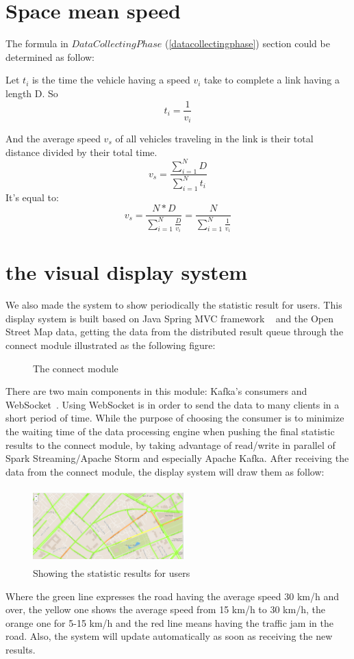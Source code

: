 \documentclass{acm_proc_article-sp}
\begin{document}
\section{Space mean speed}
The formula in $Data Collecting Phase$ (\ref{datacollectingphase}) section could be determined as follow:

Let $t_{i}$ is the time the vehicle having a speed $v_{i}$ take to complete a link having a length D. So
	\[ t_{i} = \frac{1}{v_{i}} \] 

And the average speed $v_{s}$ of all vehicles traveling in the link is their total distance divided by their total time.
	\[v_{s} = \frac{\sum_{i=1}^{N} D}{\sum_{i=1}^{N} t_{i}}\]
It's equal to:
	\[v_{s} = \frac{N \ast D}{\sum_{i=1}^{N} \frac{D}{v_{i}}} = \frac{N}{\sum_{i=1}^{N}\frac{1}{v_{i}}} \]

\section{the visual display system}

We also made the system to show periodically the statistic result for users. This display system is built based on Java Spring MVC framework ~\cite{javaspringmvc} and the Open Street Map data, getting the data from the distributed result queue through the connect module illustrated as the following figure:

\begin{figure}[h]
	\centering
	\caption{The connect module}
	\label{fig:connectmodule}
\end{figure}

There are two main components in this module: Kafka's consumers and WebSocket~\cite{websocket}. Using WebSocket is in order to send the data to many clients in a short period of time. While the purpose of choosing the consumer is to minimize the waiting time of the data processing engine when pushing the final statistic results to the connect module, by taking advantage of read/write in parallel of Spark Streaming/Apache Storm and especially Apache Kafka. After receiving the data from the connect module, the display system will draw them as follow:

	\begin{figure}[h]
		\centering
		\includegraphics[height=110px,width=220px]{Picture1}
		\caption{Showing the statistic results for users}
	\end{figure}

Where the green line expresses the road having the average speed 30 km/h and over, the yellow one shows the average speed from 15 km/h to 30 km/h, the orange one for 5-15 km/h and the red line means having the traffic jam in the road. Also, the system will update automatically as soon as receiving the new results.
\end{document}
